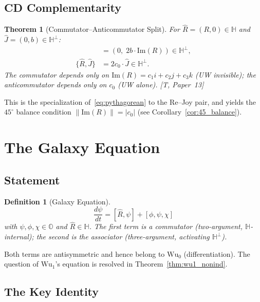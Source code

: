 \documentclass[11pt, a4paper]{article}
\newtheorem{theorem}{Theorem}
\newtheorem{definition}{Definition}
\newcommand{\Hq}{\mathbb{H}}
\newcommand{\Oct}{\mathbb{O}}
\newcommand{\Reop}{\hat{R}}
\newcommand{\Jop}{\hat{J}}
\newcommand{\Wuz}{\mathrm{Wu}_0}
\newcommand{\Wuo}{\mathrm{Wu}_1}
\newcommand{\norm}[1]{\lVert #1 \rVert}
\newcommand{\IM}{\mathrm{Im}}
\begin{document}
\subsection{CD Complementarity}

\begin{theorem}[Commutator--Anticommutator Split]
\label{thm:complementarity}
For $\Reop = (R, 0) \in \Hq$ and $\Jop = (0, b) \in \Hq^\perp$:
\begin{align}
[\Reop, \Jop] &= (0,\; 2 b \cdot \IM(R)) \in \Hq^\perp, \\
\{\Reop, \Jop\} &= 2 c_0 \cdot \Jop \in \Hq^\perp.
\end{align}
The commutator depends only on $\IM(R) = c_1 i + c_2 j + c_3 k$
(UW invisible); the anticommutator depends only on $c_0$ (UW alone).
[T, Paper~13]
\end{theorem}

This is the specialization of~\eqref{eq:pythagorean} to the
Re--Joy pair, and yields the $45^\circ$ balance condition
$\norm{\IM(R)} = |c_0|$ (see Corollary~\ref{cor:45_balance}).


\section{The Galaxy Equation}
\label{sec:galaxy}

\subsection{Statement}

\begin{definition}[Galaxy Equation]
\label{def:galaxy}
\begin{equation}
\boxed{\;\frac{d\psi}{dt} = [\Reop, \psi] + [\phi, \psi, \chi]\;}
\label{eq:galaxy}
\end{equation}
with $\psi, \phi, \chi \in \Oct$ and $\Reop \in \Hq$. The first
term is a commutator (two-argument, $\Hq$-internal); the second is
the associator (three-argument, activating $\Hq^\perp$).
\end{definition}

Both terms are antisymmetric and hence belong to $\Wuz$
(differentiation). The question of $\Wuo$'s equation is resolved
in Theorem~\ref{thm:wu1_nonind}.

\subsection{The Key Identity}
\end{document}
